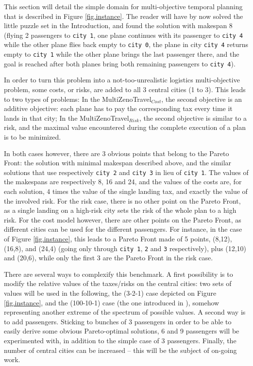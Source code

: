 \documentclass[a4paper,10pt]{article}
\def\MULTIZENO{{\sc MultiZenoTravel}}
\begin{document}
This section will detail the simple domain for multi-objective temporal planning that is described in Figure \ref{fig.instance}. The reader will have by now solved the little puzzle set in the Introduction, and found the solution with makespan 8 (flying 2 passengers to {\tt city 1}, one plane continues with its passenger to {\tt city 4} while the other plane flies back empty to {\tt city 0}, the plane in city {\tt city 4} returns empty to {\tt city 1} while the other plane brings the last passenger there, and the goal is reached after both planes bring both remaining passengers to {\tt city 4}). 

In order to turn this problem into a not-too-unrealistic logistics multi-objective problem, some costs, or risks, are added to all 3 central cities (1 to 3). This leads to two types of problems: In the \MULTIZENO$_{Cost}$, the second objective is an additive objective: each plane has to pay the corresponding tax every time it lands in that city; In the \MULTIZENO$_{Risk}$, the second objective is similar to a risk, and the maximal value encountered during the complete execution of a plan is to be minimized. 

In both cases however, there are 3 obvious points that belong to the Pareto Front: the solution with minimal makespan described above, and the similar solutions that use respectively {\tt city 2} and {\tt city 3} in lieu of {\tt city 1}. The values of the makespans are respectively 8, 16 and 24, and the values of the costs are, for each solution, 4 times the value of the single landing tax, and exactly the value of the involved risk. For the risk case, there is no other point on the Pareto Front, as a single landing on a high-risk city sets the risk of the whole plan to a high risk. For the cost model however, there are other points on the Pareto Front, as different cities can be used for the different passengers. For instance, in the case of Figure \ref{fig.instance}, this leads to a Pareto Front made of 5 points, (8,12), (16,8), and (24,4) (going only through {\tt city 1}, {\tt 2} and {\tt 3} respectively), plus (12,10) and (20,6), while only the first 3 are the Pareto Front in the risk case.

There are several ways to complexify this benchmark. A first possibility is to modify the relative values of the taxes/risks on the central cities: two sets of values will be used in the following, the (3-2-1) case depicted on Figure \ref{fig.instance}, and the (100-10-1) case (the one introduced in \cite{Schoenauer2006}), somehow representing another extreme of the spectrum of possible values. A second way is to add passengers. Sticking to bunches of 3 passengers in order to be able to easily derive some obvious Pareto-optimal solutions, 6 and 9 passengers will be experimented with, in addition to the simple case of 3 passengers. Finally, the number of central cities can be increased -- this will be the subject of on-going work.
\end{document}
